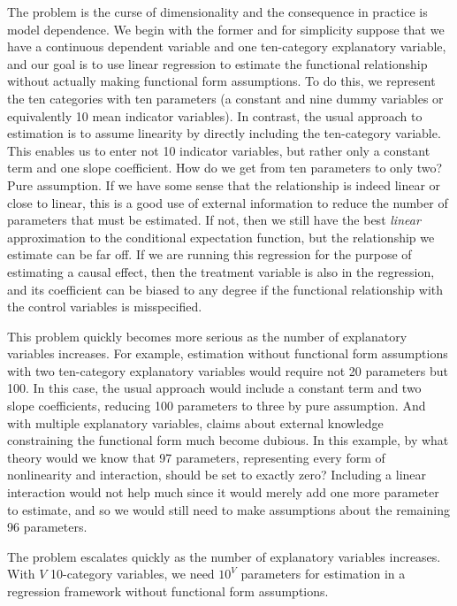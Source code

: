 \documentclass[11pt,titlepage]{article}
\begin{document}
The problem is the curse of dimensionality and the consequence in
practice is model dependence.  We begin with the former and for
simplicity suppose that we have a continuous dependent variable and
one ten-category explanatory variable, and our goal is to use linear
regression to estimate the functional relationship without actually
making functional form assumptions.  To do this, we represent the ten
categories with ten parameters (a constant and nine dummy variables or
equivalently 10 mean indicator variables).  In contrast, the usual
approach to estimation is to assume linearity by directly including
the ten-category variable.  This enables us to enter not 10 indicator
variables, but rather only a constant term and one slope coefficient.
How do we get from ten parameters to only two?  Pure assumption.  If
we have some sense that the relationship is indeed linear or close to
linear, this is a good use of external information to reduce the
number of parameters that must be estimated.  If not, then we still
have the best {\it linear} approximation to the conditional
expectation function, but the relationship we estimate can be far off.
If we are running this regression for the purpose of estimating a
causal effect, then the treatment variable is also in the regression,
and its coefficient can be biased to any degree if the functional
relationship with the control variables is misspecified.

This problem quickly becomes more serious as the number of explanatory
variables increases.  For example, estimation without functional form
assumptions with two ten-category explanatory variables would require
not 20 parameters but 100.  In this case, the usual approach would
include a constant term and two slope coefficients, reducing 100
parameters to three by pure assumption.  And with multiple explanatory
variables, claims about external knowledge constraining the functional
form much become dubious.  In this example, by what theory would we
know that 97 parameters, representing every form of nonlinearity and
interaction, should be set to exactly zero?  Including a linear
interaction would not help much since it would merely add one more
parameter to estimate, and so we would still need to make assumptions
about the remaining 96 parameters.

The problem escalates quickly as the number of explanatory variables
increases.  With $V$ 10-category variables, we need $10^V$ parameters
for estimation in a regression framework without functional form
assumptions. %
\end{document}
